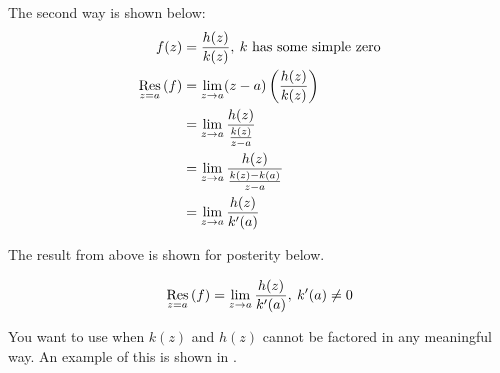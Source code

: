 The second way is shown below:
\begin{align*}
  f(z) &= \frac{h(z)}{k(z)}, \: \text{$k$ has some simple zero} \\
  \Residue{f}{z=a} &= \lim\limits_{z \to a} (z-a) \left( \frac{h(z)}{k(z)} \right) \\
       &= \lim\limits_{z \to a} \frac{h(z)}{\frac{k(z)}{z-a}} \\
       &= \lim\limits_{z \to a} \frac{h(z)}{\frac{k(z) - k(a)}{z-a}} \\
       &= \lim\limits_{z \to a} \frac{h(z)}{k'(a)} \\
\end{align*}

The result from above is shown for posterity below.

\begin{equation}\label{eq:General_Residue}
  \Residue{f}{z=a} = \lim\limits_{z \to a} \frac{h(z)}{k'(a)}, \: k'(a) \neq 0
\end{equation}

You want to use  when $k(z)$ and $h(z)$ cannot be factored in any meaningful way.
An example of this is shown in .


